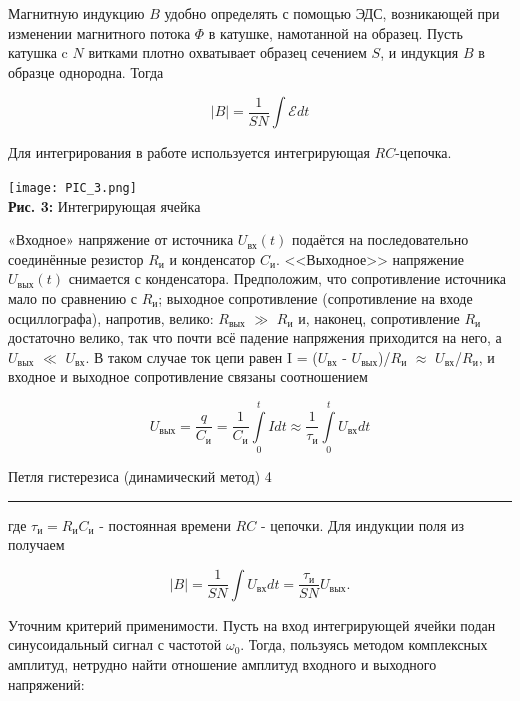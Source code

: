 \documentclass[12pt,a4paper]{scrartcl}
\begin{document}
	Магнитную индукцию $ B $ удобно
определять с помощью ЭДС, возникающей при изменении магнитного
потока $ \Phi $ в катушке, намотанной на образец. Пусть катушка c $ N $ витками плотно охватывает образец сечением $ S $, и индукция $ B $ в образце
однородна. Тогда	

	$$|B|=\frac{1}{SN}\int\mathcal{E} dt$$
	
Для интегрирования в работе используется интегрирующая $ RC $-цепочка.	

	\begin{center}
		\texttt{[image: PIC\_3.png]}
		\\\textbf{Рис. 3: } Интегрирующая ячейка
	\end{center}
	
	«Входное» напряжение от источника $U_{\text{вх}}(t)$ подаётся на последовательно соединённые резистор $R_\text{и}$ и конденсатор $C_\text{и}$. <<Выходное>>
напряжение $U_{\text{вых}}(t)$ снимается с конденсатора. Предположим, что сопротивление источника мало по сравнению с $R_\text{и}$; выходное сопротивление (сопротивление на входе осциллографа), напротив, велико: $R_{\text{вых}}$ $ \gg $ $R_\text{и}$ и, наконец, сопротивление $R_\text{и}$ достаточно велико, так что почти всё падение напряжения приходится на него, а $U_{\text{вых}}$ $\ll$ $U_{\text{вх}}$. В таком случае ток цепи равен I = ($U_{\text{вх}}$ - $U_{\text{вых}}$)/$R_\text{и}$ $\approx$ $U_{\text{вх}}$/$R_\text{и}$, и входное и выходное сопротивление связаны соотношением

	$$U_{\text{вых}} = \frac{q}{C_\text{и}} = \frac{1}{C_\text{и}}\int\limits_0^t Idt \approx \frac{1}{\tau_\text{и}} \int\limits_0^t U_{\text{вх}}dt$$
	
	\newpage
	
	
	\begin{flushleft}
		\footnotesize{Петля гистерезиса (динамический метод)} \hspace{\fill} \footnotesize{4}
		\\[-0.3cm]\noindent\rule{\textwidth}{0.3pt}
	\end{flushleft}	
	
где $\tau_\text{и}=R_\text{и}C_\text{и}$ - постоянная времени $ RC $ - цепочки. Для индукции поля из получаем

$$|B|=\frac{1}{SN}\int U_{\text{вх}} dt=\frac{\tau_\text{и}}{SN}U_{\text{вых}}.
$$

Уточним критерий применимости. Пусть на вход интегрирующей ячейки подан синусоидальный сигнал с частотой $\omega_0$. Тогда, пользуясь методом комплексных амплитуд, нетрудно найти отношение амплитуд входного и выходного напряжений: 
	
\end{document}
